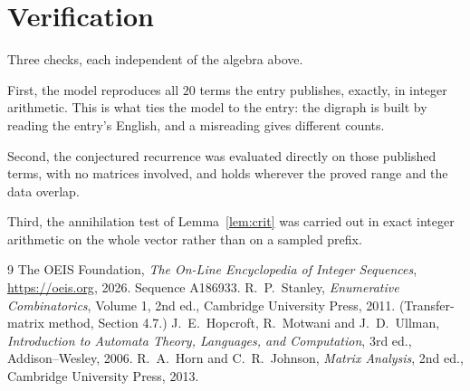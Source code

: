 \documentclass[11pt,a4paper]{article}
\theoremstyle{plain}
\theoremstyle{definition}
\begin{document}
\section{Verification}

Three checks, each independent of the algebra above.

First, the model reproduces all $20$ terms the entry publishes, exactly, in integer
arithmetic. This is what ties the model to the entry: the digraph is built by reading the
entry's English, and a misreading gives different counts.

Second, the conjectured recurrence was evaluated directly on those published terms, with no
matrices involved, and holds wherever the proved range and the data overlap.

Third, the annihilation test of Lemma~\ref{lem:crit} was carried out in exact integer
arithmetic on the whole vector rather than on a sampled prefix.

\begin{thebibliography}{9}
 The OEIS Foundation, \emph{The On-Line Encyclopedia of Integer
Sequences}, \url{https://oeis.org}, 2026. Sequence A186933.
 R.~P.~Stanley, \emph{Enumerative Combinatorics}, Volume 1, 2nd ed.,
Cambridge University Press, 2011. (Transfer-matrix method, Section 4.7.)
 J.~E.~Hopcroft, R.~Motwani and J.~D.~Ullman, \emph{Introduction to Automata
Theory, Languages, and Computation}, 3rd ed., Addison--Wesley, 2006.
 R.~A.~Horn and C.~R.~Johnson, \emph{Matrix Analysis}, 2nd ed., Cambridge
University Press, 2013.
\end{thebibliography}
\end{document}
